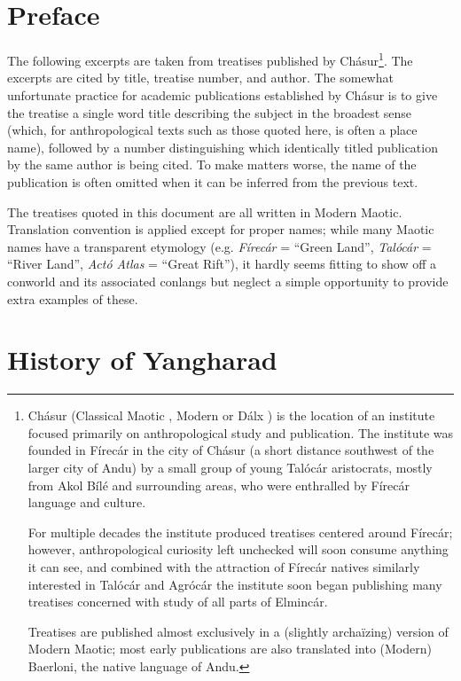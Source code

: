 \documentclass{article}
\begin{document}
\color{DarkGreen}

\section*{Preface}

The following excerpts are taken from treatises published by Chásur\footnote{\color{DarkGreen} Chásur (Classical Maotic , Modern  or Dálx ) is the location of an institute focused primarily on anthropological study and publication. The institute was founded in Fírecár in the city of Chásur (a short distance southwest of the larger city of Andu) by a small group of young Talócár aristocrats, mostly from Akol Bílé and surrounding areas, who were enthralled by Fírecár language and culture. \par For multiple decades the institute produced treatises centered around Fírecár; however, anthropological curiosity left unchecked will soon consume anything it can see, and combined with the attraction of Fírecár natives similarly interested in Talócár and Agrócár the institute soon began publishing many treatises concerned with study of all parts of Elmincár. \par Treatises are published almost exclusively in a (slightly archaïzing) version of Modern Maotic; most early publications are also translated into (Modern) Baerloni, the native language of Andu.}. The excerpts are cited by title, treatise number, and author. The somewhat unfortunate practice for academic publications established by Chásur is to give the treatise a single word title describing the subject in the broadest sense (which, for anthropological texts such as those quoted here, is often a place name), followed by a number distinguishing which identically titled publication by the same author is being cited. To make matters worse, the name of the publication is often omitted when it can be inferred from the previous text.

The treatises quoted in this document are all written in Modern Maotic. Translation convention is applied except for proper names; while many Maotic names have a transparent etymology (e.g. \textit{Fírecár} = ``Green Land'', \textit{Talócár} = ``River Land'', \textit{Actó Atlas} = ``Great Rift''), it hardly seems fitting to show off a conworld and its associated conlangs but neglect a simple opportunity to provide extra examples of these.

\section*{History of Yangharad}
\end{document}
